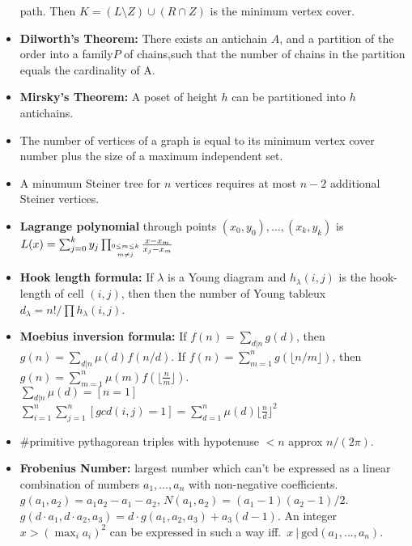 \documentclass[15pt,a4paper]{article}
\begin{document}
\begin{landscape}
\begin{multicols*}{3}
\begin{itemize}
    path. Then $K=(L\setminus Z)\cup(R\cap Z)$ is the minimum
    vertex cover.
    \item \textbf{Dilworth's Theorem:} There exists an antichain $A$,
    and a partition of the order into a family$P$ of chains,such that the number
    of chains in the partition equals the cardinality of A.
    \item \textbf{Mirsky's Theorem:} A poset of height $h$ can be partitioned into $h$ antichains.
    \item The number of vertices of a graph is equal to its minimum
    vertex cover number plus the size of a maximum independent set.
    \item A minumum Steiner tree for $n$ vertices requires at most $n-2$ additional Steiner vertices.
    \item \textbf{Lagrange polynomial} through points $(x_0,y_0),\ldots,(x_k,y_k)$ is $L(x) = \sum_{j=0}^k y_j \prod_{\shortstack{$\scriptscriptstyle 0\leq m \leq k$ \\ $\scriptscriptstyle m\neq j$}} \frac{x-x_m}{x_j - x_m}$
    \item \textbf{Hook length formula:} If $\lambda$ is a Young diagram and $h_{\lambda}(i,j)$ is the hook-length of cell $(i,j)$, then then the number of Young tableux $d_{\lambda} = n!/\prod h_{\lambda}(i,j)$.
    \item \textbf{Moebius inversion formula:} If $f(n) = \sum_{d|n} g(d)$, then $g(n) = \sum_{d|n} \mu(d) f(n/d)$. If $f(n) = \sum_{m=1}^n g(\lfloor n/m\rfloor)$, then $g(n) = \sum_{m=1}^n \mu(m)f(\lfloor\frac{n}{m}\rfloor)$.
    \\$\sum_{d|n} \mu(d) = [n=1]$
    \\$\sum_{i=1}^n\sum_{j=1}^n[gcd(i,j)=1]= \sum_{d=1}^n\mu(d)\lfloor\frac{n}{d}\rfloor^2$
    \item \#primitive pythagorean triples with hypotenuse $<n$ approx $n/(2\pi)$.
    \item \textbf{Frobenius Number:} largest number which can't be
    expressed as a linear combination of numbers $a_1,\ldots,a_n$
    with non-negative coefficients. $g(a_1,a_2) = a_1a_2-a_1-a_2$,
    $N(a_1,a_2)=(a_1-1)(a_2-1)/2$. $g(d\cdot a_1,d\cdot a_2,a_3) =
    d\cdot g(a_1,a_2,a_3) + a_3(d-1)$. An integer $x>\left(\max_i
    a_i\right)^2$ can be expressed in such a way iff.\ $x\ |\
    \mathrm{gcd}(a_1,\ldots,a_n)$.
\end{itemize}


\end{multicols*}
\end{landscape}
\end{document}
